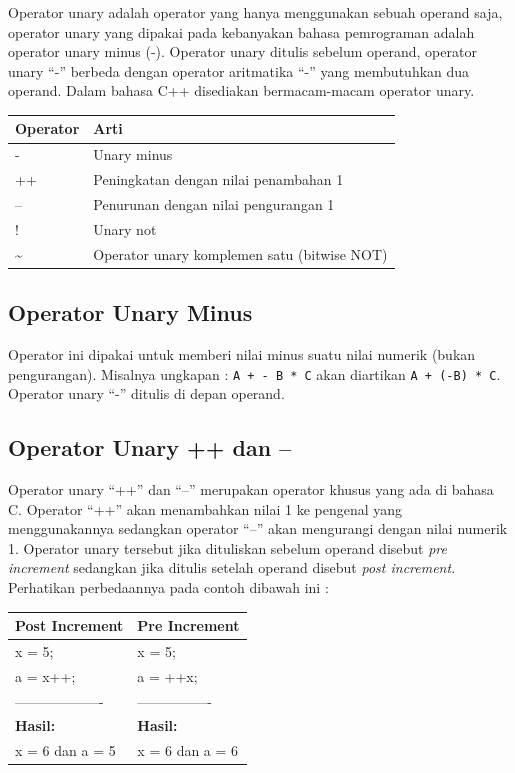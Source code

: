 Operator unary adalah operator yang hanya menggunakan sebuah operand
saja, operator unary yang dipakai pada kebanyakan bahasa pemrograman
adalah operator unary minus (-). Operator unary ditulis sebelum operand,
operator unary ``-'' berbeda dengan operator aritmatika ``-'' yang
membutuhkan dua operand. Dalam bahasa C++ disediakan bermacam-macam
operator unary.

\begin{longtable}[]{@{}ll@{}}
\toprule
Operator & Arti\tabularnewline
\midrule
\endhead
- & Unary minus\tabularnewline
++ & Peningkatan dengan nilai penambahan 1\tabularnewline
-- & Penurunan dengan nilai pengurangan 1\tabularnewline
! & Unary not\tabularnewline
\textasciitilde{} & Operator unary komplemen satu (bitwise
NOT)\tabularnewline
\bottomrule
\end{longtable}

\subsection{Operator Unary Minus}\label{b-operator-unary-minus}

Operator ini dipakai untuk memberi nilai minus suatu nilai numerik
(bukan pengurangan). Misalnya ungkapan : \texttt{A\ +\ -\ B\ *\ C} akan
diartikan \texttt{A\ +\ (-B)\ *\ C}. Operator unary ``-'' ditulis di
depan operand.

\subsection{Operator Unary ++ dan --}\label{c-operator-unary-dan}

Operator unary ``++'' dan ``--'' merupakan operator khusus yang ada di
bahasa C. Operator ``++'' akan menambahkan nilai 1 ke pengenal yang
menggunakannya sedangkan operator ``--'' akan mengurangi dengan nilai
numerik 1. Operator unary tersebut jika dituliskan sebelum operand
disebut \emph{pre increment} sedangkan jika ditulis setelah operand
disebut \emph{post increment}. Perhatikan perbedaannya pada contoh
dibawah ini :

\begin{longtable}[]{@{}ll@{}}
\toprule
Post Increment & Pre Increment\tabularnewline
\midrule
\endhead
x = 5; & x = 5;\tabularnewline
a = x++; & a = ++x;\tabularnewline
------------------- & ----------------\tabularnewline
\textbf{Hasil:} & \textbf{Hasil:}\tabularnewline
x = 6 dan a = 5 & x = 6 dan a = 6\tabularnewline
\bottomrule
\end{longtable}


